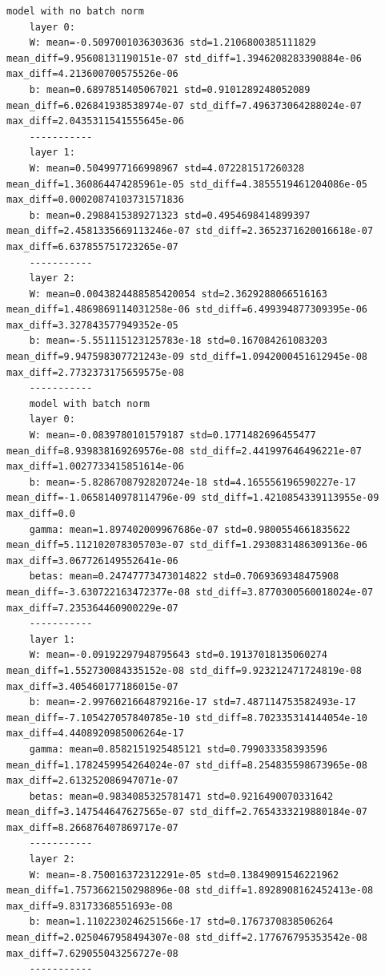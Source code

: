 \documentclass[a4paper]{article}
\begin{document}
\begin{lstlisting}[label={lst:gradient}]
	model with no batch norm
	layer 0:
	W: mean=-0.5097001036303636 std=1.2106800385111829 mean_diff=9.95608131190151e-07 std_diff=1.3946208283390884e-06 max_diff=4.213600700575526e-06
	b: mean=0.6897851405067021 std=0.9101289248052089 mean_diff=6.026841938538974e-07 std_diff=7.496373064288024e-07 max_diff=2.0435311541555645e-06
	-----------
	layer 1:
	W: mean=0.5049977166998967 std=4.072281517260328 mean_diff=1.360864474285961e-05 std_diff=4.3855519461204086e-05 max_diff=0.00020874103731571836
	b: mean=0.2988415389271323 std=0.4954698414899397 mean_diff=2.4581335669113246e-07 std_diff=2.3652371620016618e-07 max_diff=6.637855751723265e-07
	-----------
	layer 2:
	W: mean=0.0043824488585420054 std=2.3629288066516163 mean_diff=1.4869869114031258e-06 std_diff=6.499394877309395e-06 max_diff=3.327843577949352e-05
	b: mean=-5.551115123125783e-18 std=0.167084261083203 mean_diff=9.947598307721243e-09 std_diff=1.0942000451612945e-08 max_diff=2.7732373175659575e-08
	-----------
	model with batch norm
	layer 0:
	W: mean=-0.0839780101579187 std=0.1771482696455477 mean_diff=8.939838169269576e-08 std_diff=2.441997646496221e-07 max_diff=1.0027733415851614e-06
	b: mean=-5.8286708792820724e-18 std=4.165556196590227e-17 mean_diff=-1.0658140978114796e-09 std_diff=1.4210854339113955e-09 max_diff=0.0
	gamma: mean=1.897402009967686e-07 std=0.9800554661835622 mean_diff=5.112102078305703e-07 std_diff=1.2930831486309136e-06 max_diff=3.067726149552641e-06
	betas: mean=0.24747773473014822 std=0.7069369348475908 mean_diff=-3.630722163472377e-08 std_diff=3.8770300560018024e-07 max_diff=7.235364460900229e-07
	-----------
	layer 1:
	W: mean=-0.09192297948795643 std=0.19137018135060274 mean_diff=1.552730084335152e-08 std_diff=9.923212471724819e-08 max_diff=3.405460177186015e-07
	b: mean=-2.9976021664879216e-17 std=7.487114753582493e-17 mean_diff=-7.105427057840785e-10 std_diff=8.702335314144054e-10 max_diff=4.4408920985006264e-17
	gamma: mean=0.8582151925485121 std=0.799033358393596 mean_diff=1.1782459954264024e-07 std_diff=8.254835598673965e-08 max_diff=2.613252086947071e-07
	betas: mean=0.9834085325781471 std=0.9216490070331642 mean_diff=3.147544647627565e-07 std_diff=2.7654333219880184e-07 max_diff=8.266876407869717e-07
	-----------
	layer 2:
	W: mean=-8.750016372312291e-05 std=0.13849091546221962 mean_diff=1.7573662150298896e-08 std_diff=1.8928908162452413e-08 max_diff=9.83173368551693e-08
	b: mean=1.1102230246251566e-17 std=0.1767370838506264 mean_diff=2.0250467958494307e-08 std_diff=2.177676795353542e-08 max_diff=7.629055043256727e-08
	-----------
\end{lstlisting}
\end{document}
